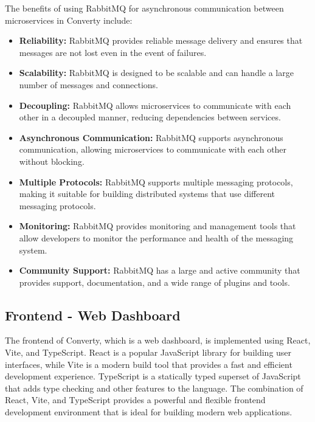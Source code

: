 The benefits of using RabbitMQ for asynchronous communication between microservices in Converty include:

\begin{itemize}
    \item \textbf{Reliability:} RabbitMQ provides reliable message delivery and ensures that messages are not lost even in the event of failures.
    \item \textbf{Scalability:} RabbitMQ is designed to be scalable and can handle a large number of messages and connections.
    \item \textbf{Decoupling:} RabbitMQ allows microservices to communicate with each other in a decoupled manner, reducing dependencies between services.
    \item \textbf{Asynchronous Communication:} RabbitMQ supports asynchronous communication, allowing microservices to communicate with each other without blocking.
    \item \textbf{Multiple Protocols:} RabbitMQ supports multiple messaging protocols, making it suitable for building distributed systems that use different messaging protocols.
    \item \textbf{Monitoring:} RabbitMQ provides monitoring and management tools that allow developers to monitor the performance and health of the messaging system.
    \item \textbf{Community Support:} RabbitMQ has a large and active community that provides support, documentation, and a wide range of plugins and tools.
\end{itemize}

\subsection{Frontend - Web Dashboard}
The frontend of Converty, which is a web dashboard, is implemented using React, Vite, and TypeScript. React is a popular JavaScript library for building user interfaces, while Vite is a modern build tool that provides a fast and efficient development experience. TypeScript is a statically typed superset of JavaScript that adds type checking and other features to the language. The combination of React, Vite, and TypeScript provides a powerful and flexible frontend development environment that is ideal for building modern web applications.

